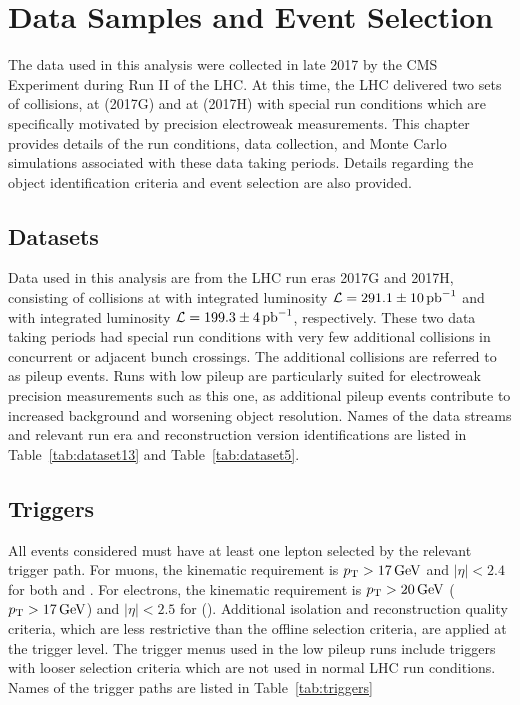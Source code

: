 \chapter{Data Samples and Event Selection}\label{ch:data}
The data used in this analysis were collected in late 2017 by the CMS Experiment during Run II of the LHC. At this time, the LHC delivered two sets of \pp collisions, at \sg (2017G) and at \sh (2017H) with special run conditions which are specifically motivated by precision electroweak measurements. This chapter provides details of the run conditions, data collection, and Monte Carlo simulations associated with these data taking periods. Details regarding the object identification criteria and event selection are also provided.



\section{Datasets}\label{ch:data:dataset}
Data used in this analysis are from the LHC run eras 2017G and 2017H, consisting of \pp collisions at \sg with integrated luminosity $\mathcal{L}=291.1\pm 10 \,\mathrm{pb}^{-1}$ and \sh with integrated luminosity $\mathcal{L}=199.3\pm 4 \,\mathrm{pb}^{-1}$, respectively. These two data taking periods had special run conditions with very few additional \pp collisions in concurrent or adjacent bunch crossings. The additional collisions are referred to as pileup events. Runs with low pileup are particularly suited for electroweak precision measurements such as this one, as additional pileup events contribute to increased background and worsening object resolution.
Names of the data streams and relevant run era and reconstruction version identifications are listed in Table~\ref{tab:dataset13} and Table~\ref{tab:dataset5}. 


\section{Triggers}\label{ch:data:triggers}
All events considered must have at least one lepton selected by the relevant trigger path. For muons, the kinematic requirement is $p_{\mathrm{T}}>17\,\text{Ge\hspace{-.08em}V}$ and $|\eta|<2.4$ for both \sg and \sh. For electrons, the kinematic requirement is $p_{\mathrm{T}}>20\,\text{Ge\hspace{-.08em}V}$ ($p_{\mathrm{T}}>17\,\text{Ge\hspace{-.08em}V}$) and $|\eta|<2.5$ for \sg (\sh). Additional isolation and reconstruction quality criteria, which are less restrictive than the offline selection criteria, are applied at the trigger level. The trigger menus used in the low pileup runs include triggers with looser selection criteria which are not used in normal LHC run conditions. Names of the trigger paths are listed in  Table~\ref{tab:triggers}



